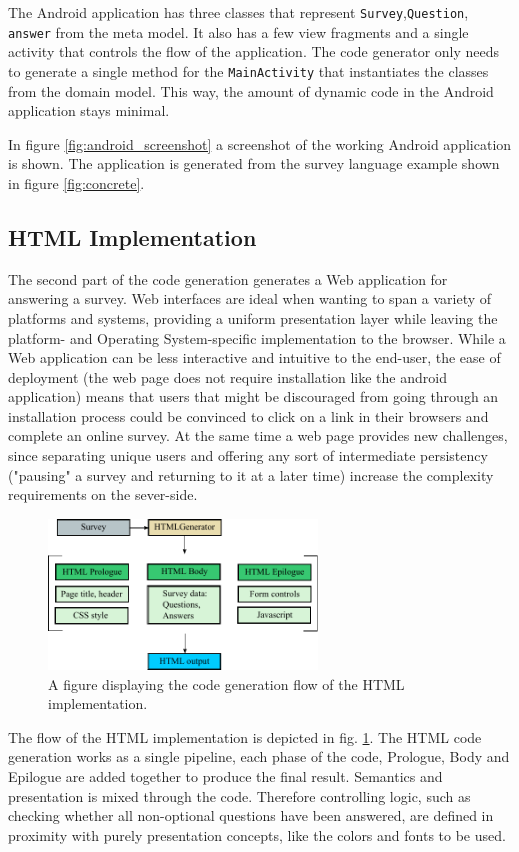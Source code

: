 \documentclass[runningheads]{llncs}
\begin{document}
The Android application has three classes that represent \texttt{Survey},\texttt{Question}, \texttt{answer} from the meta model. It also has a few view fragments and a single activity that controls the flow of the application. The code generator only needs to generate a single method for the \texttt{MainActivity} that instantiates the classes from the domain model. This way, the amount of dynamic code in the Android application stays minimal.

In figure \ref{fig:android_screenshot} a screenshot of the working Android application is shown. The application is generated from the survey language example shown in figure \ref{fig:concrete}.

\subsection {HTML Implementation}
The second part of the code generation generates a Web application for answering a survey. Web interfaces are ideal when wanting to span a variety of platforms and systems, providing a uniform presentation layer while leaving the platform- and Operating System-specific implementation to the browser. While a Web application can be less interactive and intuitive to the end-user, the ease of deployment (the web page does not require installation like the android application) means that users that might be discouraged from going through an installation process could be convinced to click on a link in their browsers and complete an online survey. At the same time a web page provides new challenges, since separating unique users and offering any sort of intermediate persistency ("pausing" a survey and returning to it at a later time) increase the complexity requirements on the sever-side. 
\begin{figure}
\centering
\includegraphics[height=4cm]{htmlgen}
\caption{A figure displaying the code generation flow of the HTML implementation.}
\label{fig:htmlgen}
\end{figure}
The flow of the HTML implementation is depicted in fig. \ref{fig:htmlgen}. The HTML code generation works as a single pipeline, each phase of the code, Prologue, Body and Epilogue are added together to produce the final result. Semantics and presentation is mixed through the code. Therefore controlling logic, such as  checking whether all non-optional questions have been answered, are defined in proximity with purely presentation concepts, like the colors and fonts to be used. 
\end{document}
